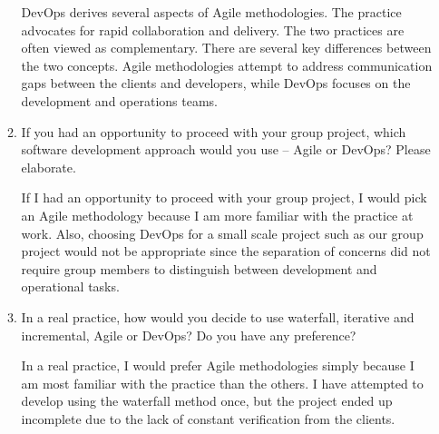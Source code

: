 \documentclass[12pt]{article}
\begin{document}
\begin{enumerate}
\begin{enumerate}[start=1,align=left]
      DevOps derives several aspects of Agile methodologies. The practice advocates for rapid collaboration and delivery. The two practices are often viewed as complementary. There are several key differences between the two concepts. Agile methodologies attempt to address communication gaps between the clients and developers, while DevOps focuses on the development and operations teams.

      \item If you had an opportunity to proceed with your group project, which software development approach would you use – Agile or DevOps? Please elaborate.

      If I had an opportunity to proceed with your group project, I would pick an Agile methodology because I am more familiar with the practice at work. Also, choosing DevOps for a small scale project such as our group project would not be appropriate since the separation of concerns did not require group members to distinguish between development and operational tasks.

      \item In a real practice, how would you decide to use waterfall, iterative and incremental, Agile or DevOps? Do you have any preference?

      In a real practice, I would prefer Agile methodologies simply because I am most familiar with the practice than the others. I have attempted to develop using the waterfall method once, but the project ended up incomplete due to the lack of constant verification from the clients.

    \end{enumerate}


  \end{enumerate}
\end{document}
